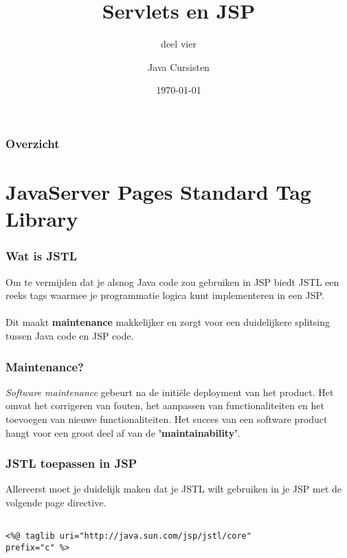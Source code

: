 \documentclass{beamer}
\title{Servlets en JSP}
\subtitle{deel vier}
\author{Java Cursisten}
\institute{INTEC Brussel}
\date{\today}
\begin{document}
\begin{frame}

\titlepage

\end{frame}

\begin{frame}

\frametitle{Overzicht}
{\LARGE \tableofcontents}

\end{frame}


\section{JavaServer Pages Standard Tag Library}


\begin{frame}

\frametitle{Wat is JSTL}

Om te vermijden dat je alsnog Java code zou gebruiken in JSP biedt JSTL een
reeks tags waarmee je programmatie logica kunt implementeren in een JSP.\\~\\

Dit maakt \textbf{maintenance} makkelijker en zorgt voor een duidelijkere splitsing tussen
Java code en JSP code.

\end{frame}


\begin{frame}

\frametitle{Maintenance?}

\textit{Software maintenance} gebeurt na de initi\"ele deployment van het product.
Het omvat het corrigeren van fouten, het aanpassen van functionaliteiten en het 
toevoegen van nieuwe functionaliteiten. Het succes van een software product hangt
voor een groot deel af van de \textbf{'maintainability'}. 

\end{frame}


\begin{frame}[fragile]

\frametitle{JSTL toepassen in JSP}

Allereerst moet je duidelijk maken dat je JSTL wilt gebruiken in je JSP met de
volgende page directive.

\begin{verbatim} 

<%@ taglib uri="http://java.sun.com/jsp/jstl/core" 
prefix="c" %>

\end{verbatim}

\end{frame}
\end{document}
